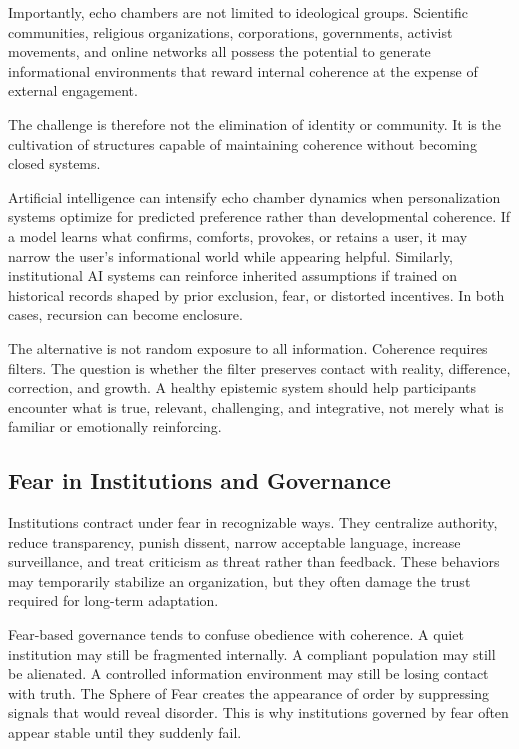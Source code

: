 \documentclass[12pt]{article}
\begin{document}
Importantly, echo chambers are not limited to ideological groups. Scientific communities, religious organizations, corporations, governments, activist movements, and online networks all possess the potential to generate informational environments that reward internal coherence at the expense of external engagement.

The challenge is therefore not the elimination of identity or community. It is the cultivation of structures capable of maintaining coherence without becoming closed systems.

Artificial intelligence can intensify echo chamber dynamics when personalization systems optimize for predicted preference rather than developmental coherence. If a model learns what confirms, comforts, provokes, or retains a user, it may narrow the user's informational world while appearing helpful. Similarly, institutional AI systems can reinforce inherited assumptions if trained on historical records shaped by prior exclusion, fear, or distorted incentives. In both cases, recursion can become enclosure.

The alternative is not random exposure to all information. Coherence requires filters. The question is whether the filter preserves contact with reality, difference, correction, and growth. A healthy epistemic system should help participants encounter what is true, relevant, challenging, and integrative, not merely what is familiar or emotionally reinforcing.

\subsection{Fear in Institutions and Governance}

Institutions contract under fear in recognizable ways. They centralize authority, reduce transparency, punish dissent, narrow acceptable language, increase surveillance, and treat criticism as threat rather than feedback. These behaviors may temporarily stabilize an organization, but they often damage the trust required for long-term adaptation.

Fear-based governance tends to confuse obedience with coherence. A quiet institution may still be fragmented internally. A compliant population may still be alienated. A controlled information environment may still be losing contact with truth. The Sphere of Fear creates the appearance of order by suppressing signals that would reveal disorder. This is why institutions governed by fear often appear stable until they suddenly fail.
\end{document}
